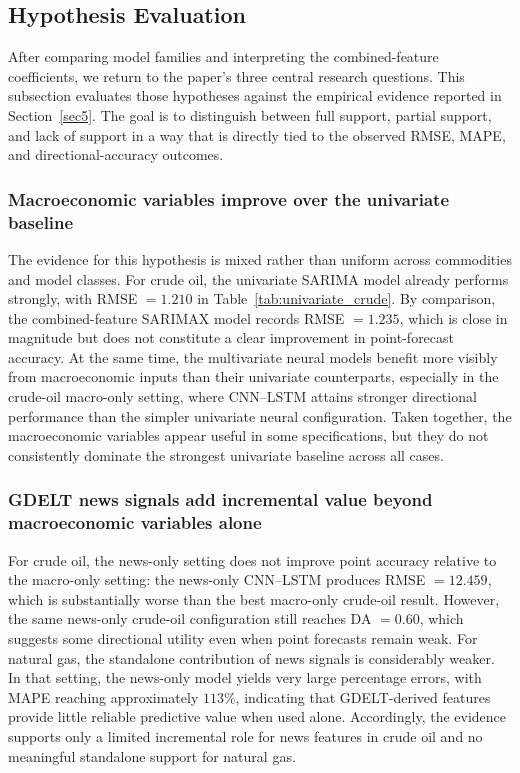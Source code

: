 \documentclass[pdflatex,sn-mathphys-num]{sn-jnl}%
\theoremstyle{thmstyleone}%
\theoremstyle{thmstyletwo}%
\theoremstyle{thmstylethree}%
\begin{document}
\subsection{Hypothesis Evaluation}\label{subsec:hypothesis_evaluation}

After comparing model families and interpreting the combined-feature coefficients, we return to the paper's three central research questions. This subsection evaluates those hypotheses against the empirical evidence reported in Section~\ref{sec5}. The goal is to distinguish between full support, partial support, and lack of support in a way that is directly tied to the observed RMSE, MAPE, and directional-accuracy outcomes.

\subsubsection{Macroeconomic variables improve over the univariate baseline}
The evidence for this hypothesis is mixed rather than uniform across commodities and model classes. For crude oil, the univariate SARIMA model already performs strongly, with RMSE $=1.210$ in Table~\ref{tab:univariate_crude}. By comparison, the combined-feature SARIMAX model records RMSE $=1.235$, which is close in magnitude but does not constitute a clear improvement in point-forecast accuracy. At the same time, the multivariate neural models benefit more visibly from macroeconomic inputs than their univariate counterparts, especially in the crude-oil macro-only setting, where CNN--LSTM attains stronger directional performance than the simpler univariate neural configuration. Taken together, the macroeconomic variables appear useful in some specifications, but they do not consistently dominate the strongest univariate baseline across all cases.

\subsubsection{GDELT news signals add incremental value beyond macroeconomic variables alone}
For crude oil, the news-only setting does not improve point accuracy relative to the macro-only setting: the news-only CNN--LSTM produces RMSE $=12.459$, which is substantially worse than the best macro-only crude-oil result. However, the same news-only crude-oil configuration still reaches DA $=0.60$, which suggests some directional utility even when point forecasts remain weak. For natural gas, the standalone contribution of news signals is considerably weaker. In that setting, the news-only model yields very large percentage errors, with MAPE reaching approximately $113\%$, indicating that GDELT-derived features provide little reliable predictive value when used alone. Accordingly, the evidence supports only a limited incremental role for news features in crude oil and no meaningful standalone support for natural gas.
\end{document}

